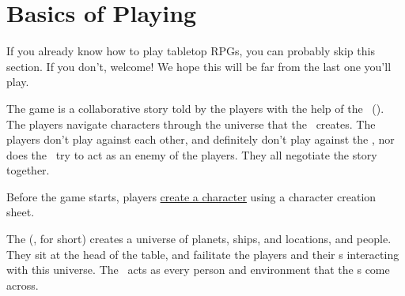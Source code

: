 \section{Basics of Playing}
\par
If you already know how to play tabletop RPGs, you can probably skip this section. If you don't, welcome! We hope this will be far from the last one you'll play.

\par
The game is a collaborative story told by the players with the help of the \gmLong\, (\gm). The players navigate characters through the universe that the \gm\, creates. The players don't play against each other, and definitely don't play against the \gm , nor does the \gm\, try to act as an enemy of the players. They all negotiate the story together.

\par
Before the game starts, players \hyperlink{Character Creation}{create a character} using a character creation sheet.

\par
The \gmLong (\gm , for short) creates a universe of planets, ships, and locations, and people. They sit at the head of the table, and failitate the players and their \pc s interacting with this universe. The \gm\, acts as every person and environment that the \pc s come across.